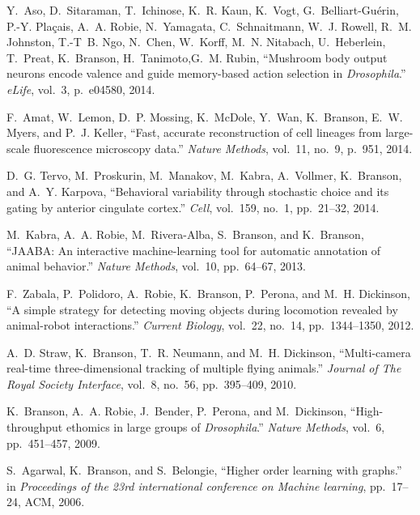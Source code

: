 \begin{cvenum}
  \item Y.~Aso, D.~Sitaraman, T.~Ichinose, K.~R. Kaun, K.~Vogt, G.~Belliart-Gu{\'e}rin, P.-Y. Pla{\c{c}}ais, A.~A. Robie, N.~Yamagata, C.~Schnaitmann, W.~J. Rowell, R.~M. Johnston, T.-T~B. Ngo, N.~Chen, W.~Korff, M.~N. Nitabach, U.~Heberlein, T.~Preat, K.~Branson, H.~Tanimoto,G.~M. Rubin,  ``Mushroom body output neurons encode valence and guide memory-based action selection in {\em {{D}}rosophila}.'' {\em eLife}, vol.~3, p.~e04580, 2014.

\item F.~Amat, W.~Lemon, D.~P. Mossing, K.~McDole, Y.~Wan, K.~Branson, E.~W. Myers,
  and P.~J. Keller, ``Fast, accurate reconstruction of cell lineages from
  large-scale fluorescence microscopy data.'' {\em Nature Methods}, vol.~11,
  no.~9, p.~951, 2014.

\item D.~G. Tervo, M.~Proskurin, M.~Manakov, M.~Kabra, A.~Vollmer, K.~Branson, and
  A.~Y. Karpova, ``Behavioral variability through stochastic choice and its
  gating by anterior cingulate cortex.'' {\em Cell}, vol.~159, no.~1,
  pp.~21--32, 2014.
  
\item M.~Kabra, A.~A. Robie, M.~Rivera-Alba, S.~Branson, and K.~Branson, ``{{JAABA}}:
  An interactive machine-learning tool for automatic annotation of animal
  behavior.'' {\em Nature Methods}, vol.~10, pp.~64--67, 2013.

\item F.~Zabala, P.~Polidoro, A.~Robie, K.~Branson, P.~Perona, and M.~H. Dickinson,
  ``A simple strategy for detecting moving objects during locomotion revealed
  by animal-robot interactions.'' {\em Current Biology}, vol.~22, no.~14,
  pp.~1344--1350, 2012.

\item A.~D. Straw, K.~Branson, T.~R. Neumann, and M.~H. Dickinson, ``Multi-camera
  real-time three-dimensional tracking of multiple flying animals.'' {\em
  Journal of The Royal Society Interface}, vol.~8, no.~56, pp.~395--409, 2010.

\item K.~Branson, A.~A. Robie, J.~Bender, P.~Perona, and M.~Dickinson,
  ``High-throughput ethomics in large groups of \emph{{D}rosophila}.'' {\em
  Nature Methods}, vol.~6, pp.~451--457, 2009.

\item S.~Agarwal, K.~Branson, and S.~Belongie, ``Higher order learning with graphs.''
  in {\em Proceedings of the 23rd international conference on Machine
  learning}, pp.~17--24, ACM, 2006.


\end{cvenum}
